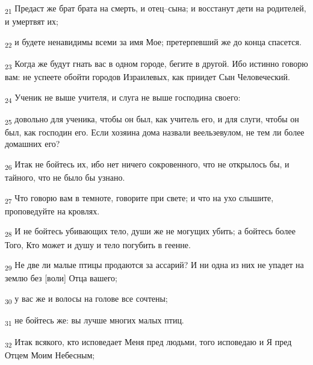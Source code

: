 \begin{tcolorbox}
\textsubscript{21} Предаст же брат брата на смерть, и отец--сына; и восстанут дети на родителей, и умертвят их;
\end{tcolorbox}
\begin{tcolorbox}
\textsubscript{22} и будете ненавидимы всеми за имя Мое; претерпевший же до конца спасется.
\end{tcolorbox}
\begin{tcolorbox}
\textsubscript{23} Когда же будут гнать вас в одном городе, бегите в другой. Ибо истинно говорю вам: не успеете обойти городов Израилевых, как приидет Сын Человеческий.
\end{tcolorbox}
\begin{tcolorbox}
\textsubscript{24} Ученик не выше учителя, и слуга не выше господина своего:
\end{tcolorbox}
\begin{tcolorbox}
\textsubscript{25} довольно для ученика, чтобы он был, как учитель его, и для слуги, чтобы он был, как господин его. Если хозяина дома назвали веельзевулом, не тем ли более домашних его?
\end{tcolorbox}
\begin{tcolorbox}
\textsubscript{26} Итак не бойтесь их, ибо нет ничего сокровенного, что не открылось бы, и тайного, что не было бы узнано.
\end{tcolorbox}
\begin{tcolorbox}
\textsubscript{27} Что говорю вам в темноте, говорите при свете; и что на ухо слышите, проповедуйте на кровлях.
\end{tcolorbox}
\begin{tcolorbox}
\textsubscript{28} И не бойтесь убивающих тело, души же не могущих убить; а бойтесь более Того, Кто может и душу и тело погубить в геенне.
\end{tcolorbox}
\begin{tcolorbox}
\textsubscript{29} Не две ли малые птицы продаются за ассарий? И ни одна из них не упадет на землю без [воли] Отца вашего;
\end{tcolorbox}
\begin{tcolorbox}
\textsubscript{30} у вас же и волосы на голове все сочтены;
\end{tcolorbox}
\begin{tcolorbox}
\textsubscript{31} не бойтесь же: вы лучше многих малых птиц.
\end{tcolorbox}
\begin{tcolorbox}
\textsubscript{32} Итак всякого, кто исповедает Меня пред людьми, того исповедаю и Я пред Отцем Моим Небесным;
\end{tcolorbox}
